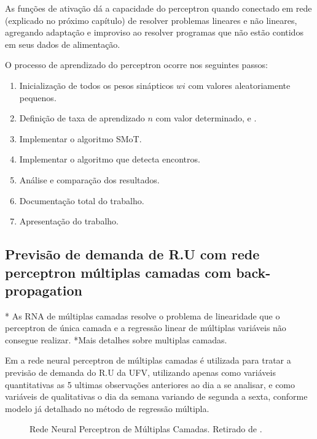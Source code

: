 \documentclass[	12pt, Times, openright, twoside, a4paper, english, brazil]{abntex2}
\begin{document}
			As funções de ativação dá a capacidade do perceptron quando conectado em rede (explicado no próximo capítulo) de resolver problemas lineares e não lineares, agregando adaptação e improviso ao resolver programas que não estão contidos em seus dados de alimentação.
			
            O processo de aprendizado do perceptron ocorre nos seguintes passos: 
            \begin{enumerate}
              \item Inicialização de todos os pesos sinápticos $wi$ com valores aleatoriamente pequenos.
              \item Definição de taxa de aprendizado $n$ com valor determinado, e  .
              \item Implementar o algoritmo SMoT.
              \item Implementar o algoritmo que detecta encontros.
              \item Análise e comparação dos resultados.
              \item Documentação total do trabalho.
              \item Apresentação do trabalho.
            \end{enumerate}
            
        \subsection{Previsão de demanda de R.U com rede perceptron múltiplas camadas com back-propagation}
          * As RNA de múltiplas camadas resolve o problema de linearidade que o perceptron de única camada e a regressão linear de múltiplas variáveis não consegue realizar. 
          *Mais detalhes sobre multiplas camadas.

          Em \cite{Lopes2008} a rede neural perceptron de múltiplas camadas é utilizada para tratar a previsão de demanda do R.U da UFV, utilizando apenas como variáveis quantitativas as 5 ultimas observações anteriores ao dia a se analisar, e como variáveis de qualitativas o dia da semana variando de segunda a sexta, conforme modelo já detalhado no método de regressão múltipla.
          \begin{figure}[!ht]
          	\caption{Rede Neural Perceptron de Múltiplas Camadas. Retirado de \cite{Lopes2008}.\label{fig:Rna-Perceptron-MultiLayer}}
          \end{figure}
\end{document}
